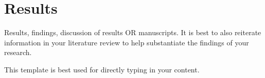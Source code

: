 \chapter{Results} \label{chapterResults}

Results, findings, discussion of results OR manuscripts.  It is best to also reiterate information in your literature review to help substantiate the findings of your research.

This template is best used for directly typing in your content. 
